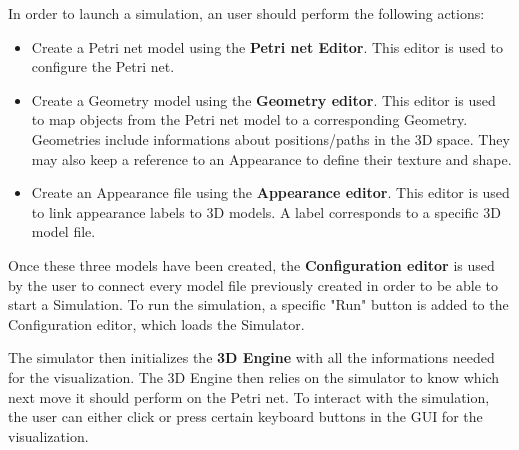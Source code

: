 In order to launch a simulation, an user should perform the following actions:

\begin{itemize}
  \item Create a Petri net model using the \textbf{Petri net Editor}. This editor is used to configure the Petri net.
  \item Create a Geometry model using the \textbf{Geometry editor}. This editor is used to map objects from the Petri net model to a corresponding Geometry. Geometries include informations about positions/paths in the 3D space. They may also keep a reference to an Appearance to define their texture and shape.
  \item Create an Appearance file using the \textbf{Appearance editor}. This editor is used to link appearance labels to 3D models. A label corresponds to a specific 3D model file. 
\end{itemize}

Once these three models have been created, the \textbf{Configuration editor} is used by the user to connect every model file previously created in order to be able to start a Simulation. 
To run the simulation, a specific "Run" button is added to the Configuration editor, which loads the Simulator.
\newline

The simulator then initializes the \textbf{3D Engine} with all the informations needed for the visualization. The 3D Engine then relies on the simulator to know which next move it should perform on the Petri net. \newline
To interact with the simulation, the user can either click or press certain keyboard buttons in the GUI for the visualization. \newline

\newpage
